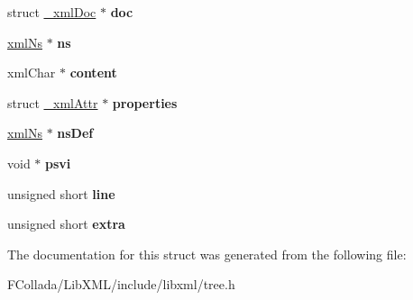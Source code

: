 \begin{DoxyCompactItemize}
\item 
\hypertarget{struct__xmlNode_a5b43d2951be50d7c213db8f6bea15759}{
struct \hyperlink{struct__xmlDoc}{\_\-xmlDoc} $\ast$ {\bfseries doc}}
\label{struct__xmlNode_a5b43d2951be50d7c213db8f6bea15759}

\item 
\hypertarget{struct__xmlNode_af902f75a3ca0a4625af1522fa949ae4a}{
\hyperlink{struct__xmlNs}{xmlNs} $\ast$ {\bfseries ns}}
\label{struct__xmlNode_af902f75a3ca0a4625af1522fa949ae4a}

\item 
\hypertarget{struct__xmlNode_a1bc96a50324a7fde5c8f35329c9ab53d}{
xmlChar $\ast$ {\bfseries content}}
\label{struct__xmlNode_a1bc96a50324a7fde5c8f35329c9ab53d}

\item 
\hypertarget{struct__xmlNode_a983dfbbe2329d6c47fcbd8a3ca492e70}{
struct \hyperlink{struct__xmlAttr}{\_\-xmlAttr} $\ast$ {\bfseries properties}}
\label{struct__xmlNode_a983dfbbe2329d6c47fcbd8a3ca492e70}

\item 
\hypertarget{struct__xmlNode_a64d3a0e8e175d8d9b375ed320fe6d667}{
\hyperlink{struct__xmlNs}{xmlNs} $\ast$ {\bfseries nsDef}}
\label{struct__xmlNode_a64d3a0e8e175d8d9b375ed320fe6d667}

\item 
\hypertarget{struct__xmlNode_a5215b42de79182852eecccec81cf362d}{
void $\ast$ {\bfseries psvi}}
\label{struct__xmlNode_a5215b42de79182852eecccec81cf362d}

\item 
\hypertarget{struct__xmlNode_a77056812e9fe4c79ba512abbccb6c4f9}{
unsigned short {\bfseries line}}
\label{struct__xmlNode_a77056812e9fe4c79ba512abbccb6c4f9}

\item 
\hypertarget{struct__xmlNode_a3e7aea99703e467874ce62cff3038f5b}{
unsigned short {\bfseries extra}}
\label{struct__xmlNode_a3e7aea99703e467874ce62cff3038f5b}

\end{DoxyCompactItemize}


The documentation for this struct was generated from the following file:\begin{DoxyCompactItemize}
\item 
FCollada/LibXML/include/libxml/tree.h\end{DoxyCompactItemize}
